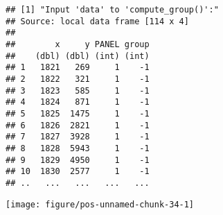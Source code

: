 \documentclass[paper=a4,10pt,div=17,headsepline,BCOR=12mm,twoside,open=right]{scrbook}\usepackage{knitr}
\begin{document}
\begin{knitrout}\footnotesize
{}\color{fgcolor}\begin{kframe}
\begin{alltt}
  \hlopt{+} \hlstd{()} \hlopt{+}
  \hlstd{()}
\end{alltt}
\begin{verbatim}
## [1] "Input 'data' to 'compute_group()':"
## Source: local data frame [114 x 4]
## 
##        x     y PANEL group
##    (dbl) (dbl) (int) (int)
## 1   1821   269     1    -1
## 2   1822   321     1    -1
## 3   1823   585     1    -1
## 4   1824   871     1    -1
## 5   1825  1475     1    -1
## 6   1826  2821     1    -1
## 7   1827  3928     1    -1
## 8   1828  5943     1    -1
## 9   1829  4950     1    -1
## 10  1830  2577     1    -1
## ..   ...   ...   ...   ...
\end{verbatim}
\end{kframe}

{\centering \texttt{[image: figure/pos-unnamed-chunk-34-1]} 

}



\end{knitrout}
\end{document}
